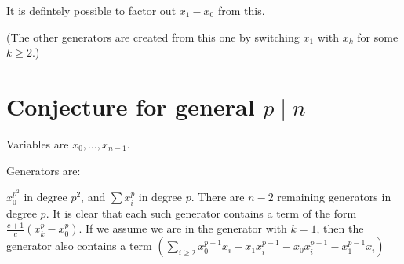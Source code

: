 \documentclass{article}
\numberwithin{equation}{section}
\begin{document}
It is defintely possible to factor out $x_1-x_0$ from this.

(The other generators are created from this one by switching $x_1$ with $x_k$ for some $k \ge 2$.)



\section{Conjecture for general $p \mid n$}

Variables are $x_0,\dots,x_{n-1}$.

Generators are:

$x_0^{p^2}$ in degree $p^2$, and $\sum x_i^p$ in degree $p$. There are $n-2$ remaining generators in degree $p$. It is clear that each such generator contains a term of the form $\frac{c+1}{c}(x_k^p-x_0^p)$. If we assume we are in the generator with $k=1$, then the generator also contains a term $\left(\sum_{i \ge 2} x_0^{p-1}x_i+x_1x_i^{p-1}-x_0x_i^{p-1}-x_1^{p-1}x_i\right)$
\end{document}
